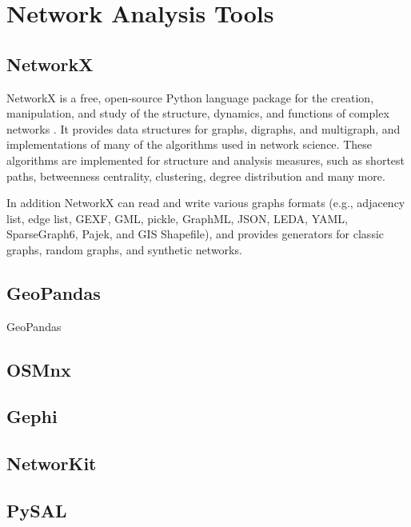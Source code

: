 \section{Network Analysis Tools}


\subsection{NetworkX}

NetworkX is a free, open-source Python language package for the creation, manipulation, and study of the structure, dynamics, and functions of complex networks \cite{hagberg-schult-swart-networkx_2008, networkx_doc}. It provides data structures for graphs, digraphs, and multigraph, and implementations of many of the algorithms used in network science. These algorithms are implemented for structure and analysis measures, such as shortest paths, betweenness centrality, clustering, degree distribution and many more.

In addition NetworkX can read and write various graphs formats (e.g., adjacency list, edge list, GEXF, GML, pickle, GraphML, JSON, LEDA, YAML, SparseGraph6, Pajek, and GIS Shapefile), and provides generators for classic graphs, random graphs, and synthetic networks.


\subsection{GeoPandas}

GeoPandas 

\subsection{OSMnx}

\subsection{Gephi}

\subsection{NetworKit}

\subsection{PySAL}

